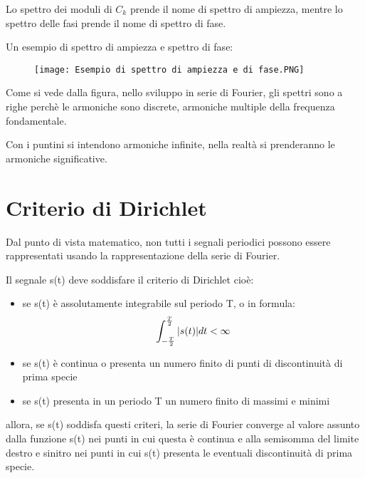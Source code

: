 Lo spettro dei moduli di $C_k$ prende il nome di spettro di ampiezza, 
mentre lo spettro delle fasi prende il nome di spettro di fase. \newline 

Un esempio di spettro di ampiezza e spettro di fase: 

\begin{figure}[h]
    \centering
    \texttt{[image: Esempio di spettro di ampiezza e di fase.PNG]}
\end{figure} 

Come si vede dalla figura, nello sviluppo in serie di Fourier, 
gli spettri sono a righe perchè le armoniche sono discrete, armoniche multiple della frequenza fondamentale. \newline 

Con i puntini si intendono armoniche infinite, nella realtà si prenderanno le armoniche significative.  

\newpage 

\section{Criterio di Dirichlet} 

Dal punto di vista matematico, non tutti i segnali periodici possono essere rappresentati 
usando la rappresentazione della serie di Fourier. \newline 

Il segnale s(t) deve soddisfare il criterio di Dirichlet cioè: 

\begin{itemize}
    \item se s(t) è assolutamente integrabile sul periodo T, o in formula: 
    \begin{equation}
        \int_{-\frac{T}{2}}^{\frac{T}{2}} \abs{s(t)} dt < \infty
    \end{equation}
    \item se s(t) è continua o presenta un numero finito di punti di discontinuità di prima specie 
    \item se s(t) presenta in un periodo T un numero finito di massimi e minimi 
\end{itemize}

allora, se s(t) soddisfa questi criteri, la serie di Fourier converge al valore assunto dalla funzione
s(t) nei punti in cui questa è continua e alla semisomma del limite destro e sinitro nei punti in cui s(t) presenta le 
eventuali discontinuità di prima specie. \newline 


